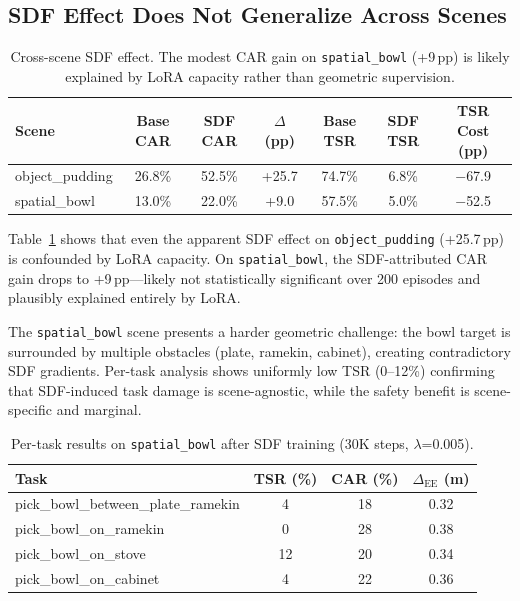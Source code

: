 \documentclass[letterpaper]{article}
\begin{document}
\subsection{SDF Effect Does Not Generalize Across Scenes}
\label{sec:exp_spatial}

\begin{table}[t]
\centering
\caption{Cross-scene SDF effect. The modest CAR gain on \texttt{spatial\_bowl} (+9\,pp) is likely explained by LoRA capacity rather than geometric supervision.}
\label{tab:cross_scene}
\begin{tabular}{lcccccc}
\toprule
Scene & Base CAR & SDF CAR & $\Delta$ (pp) & Base TSR & SDF TSR & TSR Cost (pp) \\
\midrule
object\_pudding & 26.8\% & 52.5\% & +25.7 & 74.7\% & 6.8\% & $-$67.9 \\
spatial\_bowl & 13.0\% & 22.0\% & +9.0 & 57.5\% & 5.0\% & $-$52.5 \\
\bottomrule
\end{tabular}
\end{table}

Table~\ref{tab:cross_scene} shows that even the apparent SDF effect on \texttt{object\_pudding} (+25.7\,pp) is confounded by LoRA capacity. On \texttt{spatial\_bowl}, the SDF-attributed CAR gain drops to +9\,pp---likely not statistically significant over 200 episodes and plausibly explained entirely by LoRA.

The \texttt{spatial\_bowl} scene presents a harder geometric challenge: the bowl target is surrounded by multiple obstacles (plate, ramekin, cabinet), creating contradictory SDF gradients. Per-task analysis shows uniformly low TSR (0--12\%) confirming that SDF-induced task damage is scene-agnostic, while the safety benefit is scene-specific and marginal.

\begin{table}[t]
\centering
\caption{Per-task results on \texttt{spatial\_bowl} after SDF training (30K steps, $\lambda$=0.005).}
\label{tab:spatial_detail}
\begin{tabular}{lccc}
\toprule
Task & TSR (\%) & CAR (\%) & $\Delta_{\text{EE}}$ (m) \\
\midrule
pick\_bowl\_between\_plate\_ramekin & 4 & 18 & 0.32 \\
pick\_bowl\_on\_ramekin & 0 & 28 & 0.38 \\
pick\_bowl\_on\_stove & 12 & 20 & 0.34 \\
pick\_bowl\_on\_cabinet & 4 & 22 & 0.36 \\
\bottomrule
\end{tabular}
\end{table}
\end{document}
